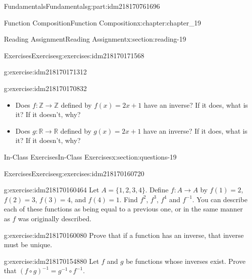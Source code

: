 \documentclass[oneside,10pt,]{book}
\numberwithin{equation}{section}
\begin{document}
\begin{partptx}{Fundamentals}{}{Fundamentals}{}{}{g:part:idm218170761696}
\begin{chapterptx}{Function Composition}{}{Function Composition}{}{}{x:chapter:chapter_19}
\begin{sectionptx}{Reading Assignment}{}{Reading Assignment}{}{}{x:section:reading-19}
\begin{exercises-subsection-numberless}{Exercises}{}{Exercises}{}{}{g:exercises:idm218170171568}
\begin{exercisegroup}
\begin{divisionexerciseeg}{1}{}{}{g:exercise:idm218170171312}
\end{divisionexerciseeg}%
\begin{divisionexerciseeg}{2}{}{}{g:exercise:idm218170170832}%
%
\begin{itemize}[label=\textbullet]
\item{}Does \(f:\mathbb{Z} \rightarrow \mathbb{Z}\) defined by \(f(x)=2x+1\) have an inverse? If it does, what is it? If it doesn't, why?%
\item{}Does \(g:\mathbb{R} \rightarrow \mathbb{R}\) defined by \(g(x)=2x+1\) have an inverse? If it does, what is it? If it doesn't, why?%
\end{itemize}
%
\end{divisionexerciseeg}%
\end{exercisegroup}
\par\medskip\noindent
\end{exercises-subsection-numberless}
\end{sectionptx}
%
%
\typeout{************************************************}
\typeout{************************************************}
%
\begin{sectionptx}{In-Class Exercises}{}{In-Class Exercises}{}{}{x:section:questions-19}
%
%
%
\typeout{************************************************}
\typeout{************************************************}
%
\begin{exercises-subsection-numberless}{Exercises}{}{Exercises}{}{}{g:exercises:idm218170160720}
\par\medskip\noindent%
%
\begin{exercisegroup}
\begin{divisionexerciseeg}{1}{}{}{g:exercise:idm218170160464}%
Let \(A = \{1, 2, 3, 4\}\). Define \(f:A\rightarrow A\) by \(f(1) = 2\), \(f(2) = 3\), \(f(3) = 4\), and \(f(4) = 1\). Find \(f^2\), \(f^3\), \(f^4\) and \(f^{-1}\).  You can describe each of these functions as being equal to a previous one, or in the same manner as \(f\) was originally described.%
\end{divisionexerciseeg}%
\begin{divisionexerciseeg}{2}{}{}{g:exercise:idm218170160080}%
Prove that if a function has an inverse, that inverse must be unique.%
\end{divisionexerciseeg}%
\begin{divisionexerciseeg}{3}{}{}{g:exercise:idm218170154880}%
Let \(f\) and \(g\) be functions whose inverses exist. Prove that \((f\circ g)^{-1}= g^{-1}\circ f^{-1}\).%

\end{divisionexerciseeg}
\end{exercisegroup}
\end{exercises-subsection-numberless}
\end{sectionptx}
\end{chapterptx}
\end{partptx}
\end{document}
